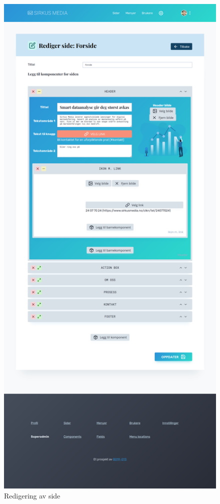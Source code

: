 \begin{figure}[H]
    \centering
    \includegraphics[height=0.8\paperheight]{cms-full/03-page-edit.png}
    \caption{Redigering av side}
\end{figure}

